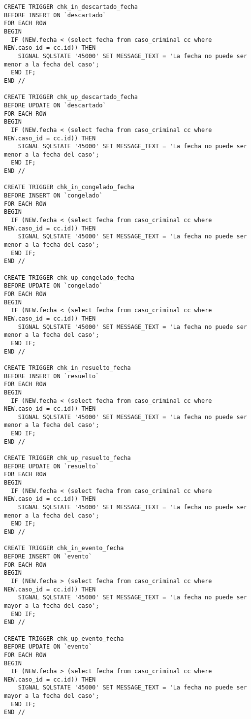 \documentclass[10pt,a4paper]{article}
\begin{document}
\begin{verbatim}
CREATE TRIGGER chk_in_descartado_fecha
BEFORE INSERT ON `descartado`
FOR EACH ROW
BEGIN
  IF (NEW.fecha < (select fecha from caso_criminal cc where NEW.caso_id = cc.id)) THEN
    SIGNAL SQLSTATE '45000' SET MESSAGE_TEXT = 'La fecha no puede ser menor a la fecha del caso';
  END IF;
END //

CREATE TRIGGER chk_up_descartado_fecha
BEFORE UPDATE ON `descartado`
FOR EACH ROW
BEGIN
  IF (NEW.fecha < (select fecha from caso_criminal cc where NEW.caso_id = cc.id)) THEN
    SIGNAL SQLSTATE '45000' SET MESSAGE_TEXT = 'La fecha no puede ser menor a la fecha del caso';
  END IF;
END //

CREATE TRIGGER chk_in_congelado_fecha
BEFORE INSERT ON `congelado`
FOR EACH ROW
BEGIN
  IF (NEW.fecha < (select fecha from caso_criminal cc where NEW.caso_id = cc.id)) THEN
    SIGNAL SQLSTATE '45000' SET MESSAGE_TEXT = 'La fecha no puede ser menor a la fecha del caso';
  END IF;
END //

CREATE TRIGGER chk_up_congelado_fecha
BEFORE UPDATE ON `congelado`
FOR EACH ROW
BEGIN
  IF (NEW.fecha < (select fecha from caso_criminal cc where NEW.caso_id = cc.id)) THEN
    SIGNAL SQLSTATE '45000' SET MESSAGE_TEXT = 'La fecha no puede ser menor a la fecha del caso';
  END IF;
END //

CREATE TRIGGER chk_in_resuelto_fecha
BEFORE INSERT ON `resuelto`
FOR EACH ROW
BEGIN
  IF (NEW.fecha < (select fecha from caso_criminal cc where NEW.caso_id = cc.id)) THEN
    SIGNAL SQLSTATE '45000' SET MESSAGE_TEXT = 'La fecha no puede ser menor a la fecha del caso';
  END IF;
END //

CREATE TRIGGER chk_up_resuelto_fecha
BEFORE UPDATE ON `resuelto`
FOR EACH ROW
BEGIN
  IF (NEW.fecha < (select fecha from caso_criminal cc where NEW.caso_id = cc.id)) THEN
    SIGNAL SQLSTATE '45000' SET MESSAGE_TEXT = 'La fecha no puede ser menor a la fecha del caso';
  END IF;
END //

CREATE TRIGGER chk_in_evento_fecha
BEFORE INSERT ON `evento`
FOR EACH ROW
BEGIN
  IF (NEW.fecha > (select fecha from caso_criminal cc where NEW.caso_id = cc.id)) THEN
    SIGNAL SQLSTATE '45000' SET MESSAGE_TEXT = 'La fecha no puede ser mayor a la fecha del caso';
  END IF;
END //

CREATE TRIGGER chk_up_evento_fecha
BEFORE UPDATE ON `evento`
FOR EACH ROW
BEGIN
  IF (NEW.fecha > (select fecha from caso_criminal cc where NEW.caso_id = cc.id)) THEN
    SIGNAL SQLSTATE '45000' SET MESSAGE_TEXT = 'La fecha no puede ser mayor a la fecha del caso';
  END IF;
END //


\end{verbatim}
\end{document}
